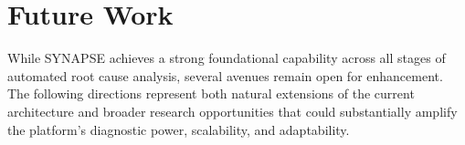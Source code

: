 \vspace{0.3cm}

\section{Future Work}
\vspace{0.2cm}

\hspace*{0.3in} While SYNAPSE achieves a strong foundational capability across all stages of automated root cause analysis, several avenues remain open for enhancement. The following directions represent both natural extensions of the current architecture and broader research opportunities that could substantially amplify the platform's diagnostic power, scalability, and adaptability.\\

